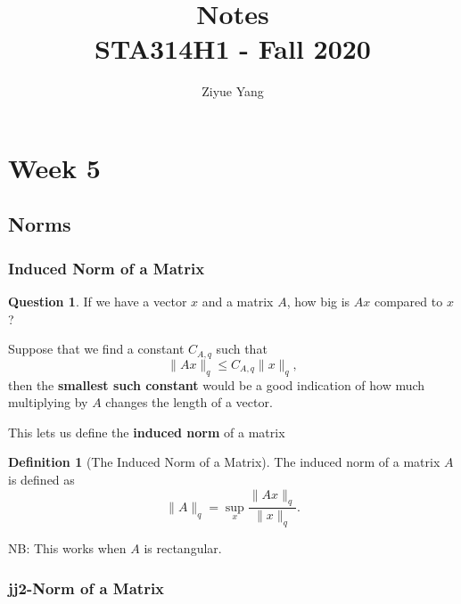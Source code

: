 \documentclass[11pt]{article}
\title{Notes\\
  {\large STA314H1 - Fall 2020}}
\author{Ziyue Yang}
\theoremstyle{definition}
\newtheorem{definition}{Definition}[section]
\newtheorem{question}{Question}[section]
\numberwithin{equation}{section}
\begin{document}
\maketitle

\tableofcontents

\newpage

\section{Week 5}

\subsection{Norms}

\subsubsection{Induced Norm of a Matrix}

\begin{question}
  If we have a vector $x$ and a matrix $A$, how big is $Ax$ compared to $x$?

  Suppose that we find a constant $C_{A, q}$ such that
  \begin{equation}
    \| Ax\|_q \leq C_{A, q}\|x\|_q,
  \end{equation}
  then the \textbf{smallest such constant} would be a good indication of how much multiplying by $A$ changes the length of a vector.
\end{question}
\begin{writenotes}
  This lets us define the \textbf{induced norm} of a matrix
\end{writenotes}

\begin{definition}[The Induced Norm of a Matrix]
The induced norm of a matrix $A$ is defined as
  \begin{equation}
    \|A\|_q = \sup_x\frac{\|Ax\|_q}{\|x\|_q}.
  \end{equation}
\end{definition}

\begin{writenotes}
  NB: This works when $A$ is rectangular.
\end{writenotes}

\subsubsection{jj2-Norm of a Matrix}
\end{document}
